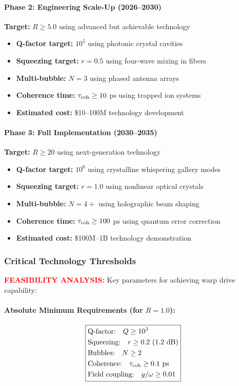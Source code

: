 \documentclass[11pt]{article}
\begin{document}
{\paragraph{Phase 2: Engineering Scale-Up (2026--2030)}
\textbf{Target:} $R \geq 5.0$ using advanced but achievable technology
\begin{itemize}
  \item \textbf{Q-factor target:} $10^5$ using photonic crystal cavities
  \item \textbf{Squeezing target:} $r = 0.5$ using four-wave mixing in fibers
  \item \textbf{Multi-bubble:} $N = 3$ using phased antenna arrays
  \item \textbf{Coherence time:} $\tau_{\rm coh} \geq 10$ ps using trapped ion systems
  \item \textbf{Estimated cost:} \$10--100M technology development
\end{itemize}

\paragraph{Phase 3: Full Implementation (2030--2035)}
\textbf{Target:} $R \geq 20$ using next-generation technology
\begin{itemize}
  \item \textbf{Q-factor target:} $10^6$ using crystalline whispering gallery modes
  \item \textbf{Squeezing target:} $r = 1.0$ using nonlinear optical crystals
  \item \textbf{Multi-bubble:} $N = 4+$ using holographic beam shaping
  \item \textbf{Coherence time:} $\tau_{\rm coh} \geq 100$ ps using quantum error correction
  \item \textbf{Estimated cost:} \$100M--1B technology demonstration
\end{itemize}

\subsubsection*{Critical Technology Thresholds}
\textcolor{red}{\textbf{FEASIBILITY ANALYSIS:}} Key parameters for achieving warp drive capability:

\paragraph{Absolute Minimum Requirements (for $R = 1.0$):}
\[
\boxed{
\begin{aligned}
&\text{Q-factor:} \quad Q \geq 10^3 \\
&\text{Squeezing:} \quad r \geq 0.2 \text{ (1.2 dB)} \\
&\text{Bubbles:} \quad N \geq 2 \\
&\text{Coherence:} \quad \tau_{\rm coh} \geq 0.1\text{ ps} \\
&\text{Field coupling:} \quad g/\omega \geq 0.01
\end{aligned}
}
\]

}
\end{document}
